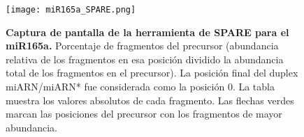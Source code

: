 \begin{landscape}
    \begin{figure}[htbp!] 
        \centering    
        \texttt{[image: miR165a\_SPARE.png]}
        \caption[Captura de pantalla de la herramienta de SPARE para el miR165a]{
        \textbf{Captura de pantalla de la herramienta de SPARE para el miR165a.}
        Porcentaje de fragmentos del precursor (abundancia relativa de los fragmentos en esa posición dividido la abundancia total de los fragmentos en el precursor).
        La posición final del duplex miARN/miARN* fue considerada como la posición 0.
        La tabla muestra los valores absolutos de cada fragmento.
        Las flechas verdes marcan las posiciones del precursor con los fragmentos de mayor abundancia. 
        }
         \label{fig:miR165a_SPARE}
    \end{figure}
\end{landscape}



